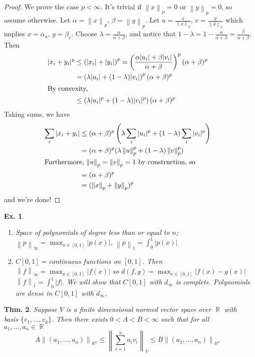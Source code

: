 \documentclass[12pt, a4paper]{book}
\DeclareMathOperator{\R}{\mathbb{R}}
\newcommand{\norm}[1]{\left\lVert#1\right\rVert} %
\newtheorem{theorem}{Thm.}[section]
\newtheorem{example}[theorem]{Ex.}
\theoremstyle{nonumberplain}
\newtheorem{proof}{Proof}
\begin{document}
\begin{proof}
    We prove the case $p<\infty$. It's trivial if $\norm{x}_p=0$ or $\norm{y}_p=0$, so assume otherwise. Let $\alpha=\norm{x}_p$,
    $\beta=\norm{y}_p$. Let $u=\frac{x}{\norm{x}_p}$, $v=\frac{y}{\norm{y}_p}$ which implies $x=\alpha_u$, $y=\beta_v$.
    Choose $\lambda=\frac{\alpha}{\alpha+\beta}$, and notice that $1-\lambda=1-\frac{\alpha}{\alpha+\beta}=\frac{\beta}{\alpha+\beta}$.
    Then
    \begin{align*}
        |x_i+y_i|^p &\leq \left( |x_i|+|y_i| \right)^p = \left( \frac{\alpha|u_i|+\beta|v_i|}{\alpha+\beta} \right)^p(\alpha+\beta)^p\\
        &= \left( \lambda|u_i|+(1-\lambda)|v_i| \right)^p(\alpha+\beta)^p\\
        \intertext{By convexity,}
        &\leq \left( \lambda|u_i|^p+(1-\lambda)|v_i|^p \right)(\alpha+\beta)^p
    \end{align*}
    Taking sums, we have
    \begin{align*}
        \sum\limits_i|x_i+y_i| &\leq (\alpha+\beta)^p\left( \lambda\sum\limits_i|u_i|^p+(1-\lambda)\sum\limits_i|v_i|^p \right)\\
        &= (\alpha+\beta)^p(\lambda\norm{u}_p^p+(1-\lambda)\norm{v}_p^p)\\
        \intertext{Furthermore, $\norm{u}_p=\norm{v}_p=1$ by construction, so}
        &= (\alpha+\beta)^p\\
        &= (\norm{x}_p+\norm{y}_p)^p
    \end{align*}
    and we're done!
\end{proof}
\begin{example}
    \begin{enumerate}
        \item Space of polynomials of degree less than or equal to $n$; $\norm{p}_\infty=\max_{x\in[0,1]}|p(x)|$,
            $\norm{p}_1=\int_0^1|p(x)|$
        \item $C[0,1]=$continuous functions on $[0,1]$. Then $\norm{f}_\infty=\max_{x\in[0,1]}|f(x)|$ so $d(f,g)=\max_{x\in[0,1]}|f(x)-g(x)|$
            $\norm{f}_1=\int_0^1|f|$. We will show that $C[0,1]$ with $d_\infty$ is complete. Polynomials are dense in $C[0,1]$ with
            $d_\infty$.
    \end{enumerate}
\end{example}
\begin{theorem}
    Suppose $V$ is a finite dimensional normed vector space over $\R$ with basis $\{v_1,\ldots,v_k\}$. Then there
    exists $0<A<B<\infty$ such that for all $a_1,\ldots,a_n\in\R$
    \[A\norm{(a_1,\ldots,a_n)}_{\R^n}\leq \norm{\sum\limits_{i=1}^na_iv_i}_V\leq B\norm{(a_1,\ldots,a_n)}_{\R^n}\]
\end{theorem}
\end{document}
